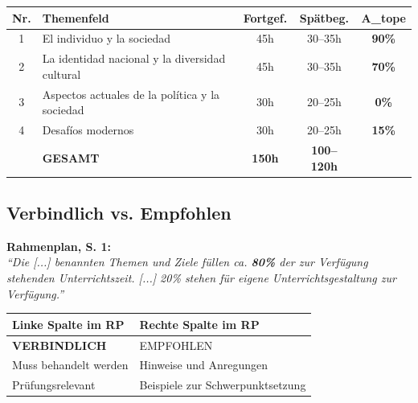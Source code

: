 \documentclass[10pt,a4paper]{article}
\begin{document}
\begin{center}
\begin{tabular}{|c|p{5.5cm}|c|c|c|}
\hline
\rowcolor{spaet}\color{white}\textbf{Nr.} & \color{white}\textbf{Themenfeld} & \color{white}\textbf{Fortgef.} & \color{white}\textbf{Spätbeg.} & \color{white}\textbf{A\_tope} \\
\hline
1 & El individuo y la sociedad & 45h & 30--35h & \textcolor{success}{\textbf{90\%}} \\
\hline
2 & La identidad nacional y la diversidad cultural & 45h & 30--35h & \textcolor{warning}{\textbf{70\%}} \\
\hline
3 & Aspectos actuales de la política y la sociedad & 30h & 20--25h & \textcolor{spanisch}{\textbf{0\%}} \\
\hline
4 & Desafíos modernos & 30h & 20--25h & \textcolor{spanisch}{\textbf{15\%}} \\
\hline
\rowcolor{lightspaet}
& \textbf{GESAMT} & \textbf{150h} & \textbf{100--120h} & \\
\hline
\end{tabular}
\end{center}

\subsection{Verbindlich vs. Empfohlen}

\begin{rechtbox}
\textbf{Rahmenplan, S. 1:}\\
\textit{``Die [...] benannten Themen und Ziele füllen ca. \textbf{80\%} der zur Verfügung stehenden Unterrichtszeit. [...] 20\% stehen für eigene Unterrichtsgestaltung zur Verfügung.''}
\end{rechtbox}

\begin{center}
\begin{tabular}{|p{6cm}|p{7cm}|}
\hline
\rowcolor{lightgray}
\textbf{Linke Spalte im RP} & \textbf{Rechte Spalte im RP} \\
\hline
\textbf{VERBINDLICH} & EMPFOHLEN \\
\hline
Muss behandelt werden & Hinweise und Anregungen \\
\hline
Prüfungsrelevant & Beispiele zur Schwerpunktsetzung \\
\hline
\end{tabular}
\end{center}

\newpage
\end{document}
